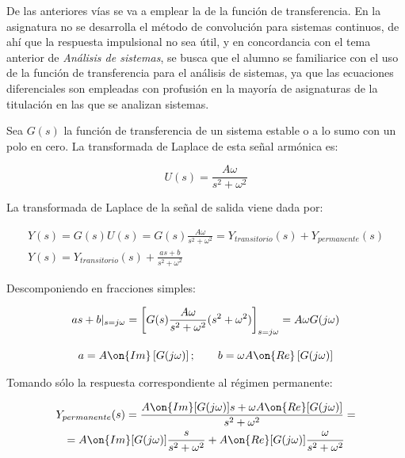 
De las anteriores vías se va a emplear la de la función de transferencia. En la asignatura no
se desarrolla el método de convolución para sistemas continuos, de ahí que la respuesta
impulsional no sea útil, y en concordancia con el tema anterior de \textsl{Análisis de
sistemas}, se busca que el alumno se familiarice con el uso de la función de transferencia para
el análisis de sistemas, ya que las ecuaciones diferenciales son empleadas con profusión en la
mayoría de asignaturas de la titulación en las que se analizan sistemas.

Sea $G(s)$ la función de transferencia de un sistema estable o a lo sumo con un polo en cero. La
transformada de Laplace de esta señal armónica es:

\begin{equation*}
	U(s)=\frac{A\omega}{s^{2}+\omega^{2}} 
\end{equation*}

La transformada de Laplace de la señal de salida viene dada por:

\begin{gather*}
	Y(s) = G(s)U(s) = G(s)\frac{A\omega}{s^{2}+\omega^{2}} = 
		Y_{transitorio}(s) + Y_{permanente}(s)\\ 
	Y(s) = Y_{transitorio}(s) + \frac{as+b}{s^{2}+\omega^{2}} 
\end{gather*}

Descomponiendo en fracciones simples: 

\begin{gather*}
	as+b|_{s=j\omega} = \left[ G(s) \frac{A\omega}{s^{2}+\omega^{2}}
		(s^{2}+\omega^{2})\right]_{s=j\omega } = A\omega G(j\omega ) \\[2ex]
	a = A\on{Im}\left[ G(j\omega)\right]; \qquad 
	b = \omega A\on{Re}\left[ G(j\omega) \right] 
\end{gather*}

Tomando sólo la respuesta correspondiente al régimen permanente:

\begin{multline*}
	Y_{permanente}(s) = \frac{A\on{Im} [G(j\omega)]s +
		\omega A \on{Re}[G(j\omega)]}{s^{2}+\omega^{2}} = \\ 
	= A\on{Im}[G(j\omega)] \frac{s}{s^{2}+\omega ^{2}} + 
		A\on{Re}[G(j\omega)] \frac{\omega}{s^{2}+\omega ^{2}}
\end{multline*}

